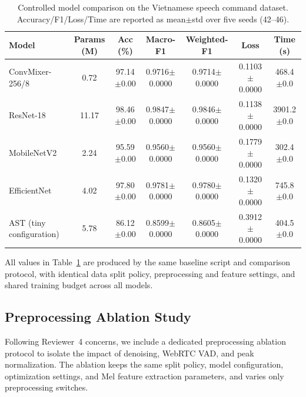 \begin{table}[htbp]
\centering
\small
\caption{\label{tab:controlled_model_comparison}Controlled model comparison on the Vietnamese speech command dataset. Accuracy/F1/Loss/Time are reported as mean$\pm$std over five seeds (42--46).}
\begin{tabular}{lcccccc}
\hline
\textbf{Model} & \textbf{Params (M)} & \textbf{Acc (\%)} & \textbf{Macro-F1} & \textbf{Weighted-F1} & \textbf{Loss} & \textbf{Time (s)} \\
\hline
ConvMixer-256/8 & 0.72 & 97.14$\pm$0.00 & 0.9716$\pm$0.0000 & 0.9714$\pm$0.0000 & 0.1103$\pm$0.0000 & 468.4$\pm$0.0 \\
ResNet-18 & 11.17 & 98.46$\pm$0.00 & 0.9847$\pm$0.0000 & 0.9846$\pm$0.0000 & 0.1138$\pm$0.0000 & 3901.2$\pm$0.0 \\
MobileNetV2 & 2.24 & 95.59$\pm$0.00 & 0.9560$\pm$0.0000 & 0.9560$\pm$0.0000 & 0.1779$\pm$0.0000 & 302.4$\pm$0.0 \\
EfficientNet & 4.02 & 97.80$\pm$0.00 & 0.9781$\pm$0.0000 & 0.9780$\pm$0.0000 & 0.1320$\pm$0.0000 & 745.8$\pm$0.0 \\
AST (tiny configuration) & 5.78 & 86.12$\pm$0.00 & 0.8599$\pm$0.0000 & 0.8605$\pm$0.0000 & 0.3912$\pm$0.0000 & 404.5$\pm$0.0 \\
\hline
\end{tabular}
\normalsize
\end{table}

All values in Table~\ref{tab:controlled_model_comparison} are produced by the same baseline script and comparison protocol, with identical data split policy, preprocessing and feature settings, and shared training budget across all models.

\subsection*{Preprocessing Ablation Study}

Following Reviewer~4 concerns, we include a dedicated preprocessing ablation protocol to isolate the impact of denoising, WebRTC VAD, and peak normalization. The ablation keeps the same split policy, model configuration, optimization settings, and Mel feature extraction parameters, and varies only preprocessing switches.


